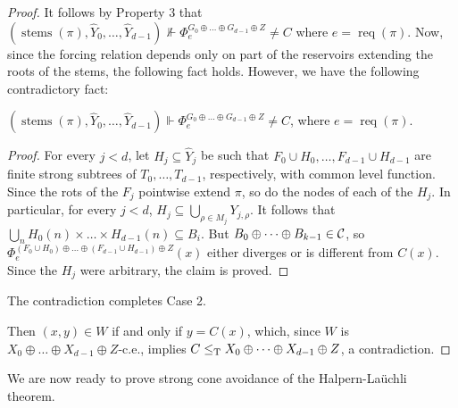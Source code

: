 \begin{proof}
	It follows by
	Property 3 that $(\operatorname{stems}(\pi), \hat{Y}_0, \dots, \hat{Y}_{d-1}) \nVdash \Phi_e^{G_0 \oplus \dots \oplus G_{d-1} \oplus Z} \neq C$ where $e = \operatorname{req}(\pi)$. Now, since the forcing relation depends only on part of the reservoirs extending the roots of the stems, the following fact holds. However, we have the following contradictory fact:

	\begin{claim}\label{fact:hl-sca-case2-force-diag}
	$(\operatorname{stems}(\pi), \hat{Y}_0, \dots, \hat{Y}_{d-1}) \Vdash \Phi_e^{G_0 \oplus \dots \oplus G_{d-1} \oplus Z} \neq C$, where $e = \operatorname{req}(\pi)$.
	\end{claim}
	\begin{proof}
	For every $j < d$, let $H_j \subseteq \hat{Y}_j$ be such that
	$F_0 \cup H_0, \dots, F_{d-1} \cup H_{d-1}$ are finite strong subtrees of $T_0, \dots, T_{d-1}$, respectively, with common level function. Since the rots of the $F_j$ pointwise extend $\pi$, so do the nodes of each of the $H_j$. In particular, for every $j < d$, $H_j \subseteq  \bigcup_{\rho \in M_j} Y_{j,\rho}$. It follows that $\bigcup_n H_0(n) \times \dots \times H_{d-1}(n) \subseteq B_i$. But $B_0 \oplus  \dots \oplus B_{k-1} \in \mathcal{C}$, so $\Phi_e^{(F_0 \cup H_0) \oplus \dots \oplus (F_{d-1} \cup H_{d-1}) \oplus Z}(x)$ either diverges or is different from $C(x)$.
	Since the $H_j$ were arbitrary, the claim is proved.
	\end{proof}

	The contradiction completes Case 2.

 Then $(x,y) \in W$ if and only if $y = C(x)$, which, since $W$ is $X_0 \oplus \dots \oplus X_{d-1} \oplus Z$-c.e., implies $C \leq_{\text{\upshape T}} X_0 \oplus \dots \oplus X_{d-1} \oplus Z$, a contradiction.
\end{proof}

We are now ready to prove strong cone avoidance of the Halpern-La\"{u}chli theorem.

